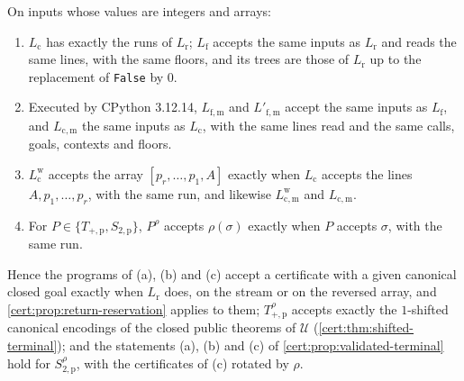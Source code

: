 \begin{proposition}\label{cert:prop:returned-floor}
On inputs whose values are integers and arrays:
\begin{enumerate}[label=(\alph*)]
\item $L_{\mathrm c}$ has exactly the runs of $L_{\mathrm r}$; $L_{\mathrm f}$
accepts the same inputs as $L_{\mathrm r}$ and reads the same lines, with the same
floors, and its trees are those of $L_{\mathrm r}$ up to the replacement of
\texttt{False} by $0$.
\item Executed by CPython 3.12.14, $L_{\mathrm{f,m}}$ and $L'_{\mathrm{f,m}}$
accept the same inputs as $L_{\mathrm f}$, and $L_{\mathrm{c,m}}$ the same inputs
as $L_{\mathrm c}$, with the same lines read and the same calls, goals,
contexts and floors.
\item $L^{\mathrm w}_{\mathrm c}$ accepts the array $[p_r,\dots,p_1,A]$ exactly
when $L_{\mathrm c}$ accepts the lines $A,p_1,\dots,p_r$, with the same run, and
likewise $L^{\mathrm w}_{\mathrm{c,m}}$ and $L_{\mathrm{c,m}}$.
\item For $P\in\{T_{+,\mathrm p},S_{2,\mathrm p}\}$, $P^{\rho}$ accepts
$\rho(\sigma)$ exactly when $P$ accepts $\sigma$, with the same run.
\end{enumerate}
Hence the programs of (a), (b) and (c) accept a certificate with a given
canonical closed goal exactly when $L_{\mathrm r}$ does, on the stream or on the
reversed array, and \cref{cert:prop:return-reservation} applies to them;
$T^{\rho}_{+,\mathrm p}$ accepts exactly the $1$-shifted canonical encodings of
the closed public theorems of $\mathcal U$ (\cref{cert:thm:shifted-terminal});
and the statements (a), (b) and (c) of \cref{cert:prop:validated-terminal} hold
for $S^{\rho}_{2,\mathrm p}$, with the certificates of (c) rotated by $\rho$.
\end{proposition}
